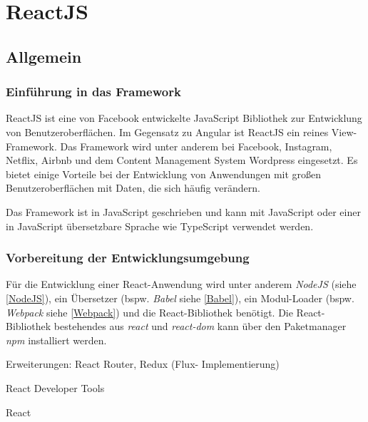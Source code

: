 \chapter{ReactJS}
\label{ch:reactJS}

\section{Allgemein}

\subsection{Einführung in das Framework}

ReactJS ist eine von Facebook entwickelte JavaScript Bibliothek zur Entwicklung von Benutzeroberflächen. Im Gegensatz zu Angular ist ReactJS ein reines View-Framework. Das Framework wird unter anderem bei Facebook, Instagram, Netflix, Airbnb und dem Content Management System Wordpress eingesetzt. Es bietet einige Vorteile bei der Entwicklung von Anwendungen mit großen Benutzeroberflächen mit Daten, die sich häufig verändern. 

Das Framework ist in JavaScript geschrieben und kann mit JavaScript oder einer in JavaScript übersetzbare Sprache wie TypeScript verwendet werden.\autocites[vgl.][1\psqq]{Gackenheimer.2015}[vgl.][3\psqq]{Zeigermann.2016}


\subsection{Vorbereitung der Entwicklungsumgebung}
Für die Entwicklung einer React-Anwendung wird unter anderem \textit{NodeJS} (siehe \autoref{NodeJS}), ein Übersetzer (bspw. \textit{Babel} siehe \autoref{Babel}), ein Modul-Loader (bspw. \textit{Webpack} siehe \autoref{Webpack}) und die React-Bibliothek benötigt. Die React-Bibliothek bestehendes aus \textit{react} und \textit{react-dom} kann über den Paketmanager \textit{npm} installiert werden. \autocites[vgl.][92\psqq]{Stefanov.2017}[vgl.][8\psqq]{Zeigermann.2016}





Erweiterungen: React Router, Redux (Flux- Implementierung)

React Developer Tools

React



